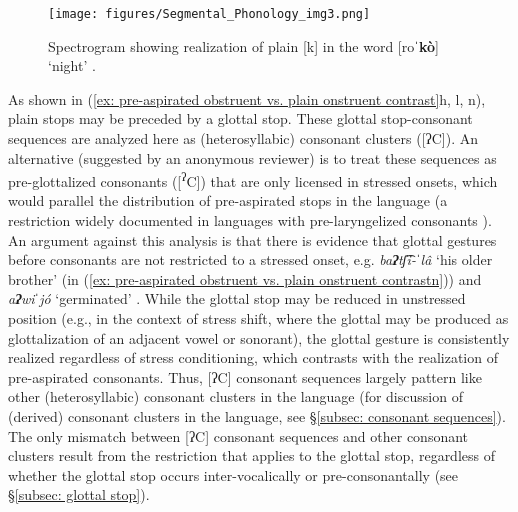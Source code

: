 \begin{figure}
\texttt{[image: figures/Segmental\_Phonology\_img3.png]}
\caption{
\label{fig: plain stop illustration}
Spectrogram showing realization of plain [k] in the word [ro\textbf{ˈkò}] ‘night’
.}
\end{figure}

\largerpage[2]
As shown in (\ref{ex: pre-aspirated obstruent vs. plain onstruent contrast}h, l, n), plain stops may be preceded by a glottal stop. These glottal stop-consonant sequences are analyzed here as (heterosyllabic) consonant clusters ([ʔC]). An alternative (suggested by an anonymous reviewer) is to treat these sequences as pre-glottalized consonants ([\textsuperscript{ʔ}C]) that are only licensed in stressed onsets, which would parallel the distribution of pre-aspirated stops in the language (a restriction widely documented in languages with pre-laryngelized consonants \citep{clayton2010natural}). An argument against this analysis is that there is evidence that glottal gestures before consonants are not restricted to a stressed onset, e.g. \textit{ba\textbf{ʔ}tʃ͡i-ˈlâ}  ‘his older brother’ (in (\ref{ex: pre-aspirated obstruent vs. plain onstruent contrastn})) and \textit{a\textbf{ʔ}wiˈjó} `germinated' . While the glottal stop may be reduced in unstressed position (e.g., in the context of stress shift, where the glottal may be produced as glottalization of an adjacent vowel or sonorant), the glottal gesture is consistently realized regardless of stress conditioning, which contrasts with the realization of pre-aspirated consonants. Thus, [ʔC] consonant sequences largely pattern like other (heterosyllabic) consonant clusters in the language (for discussion of (derived) consonant clusters in the language, see §\ref{subsec: consonant sequences}). The only mismatch between [ʔC] consonant sequences and other consonant clusters result from the restriction that applies to the glottal stop, regardless of whether the glottal stop occurs inter-vocalically or pre-consonantally (see §\ref{subsec: glottal stop}).


